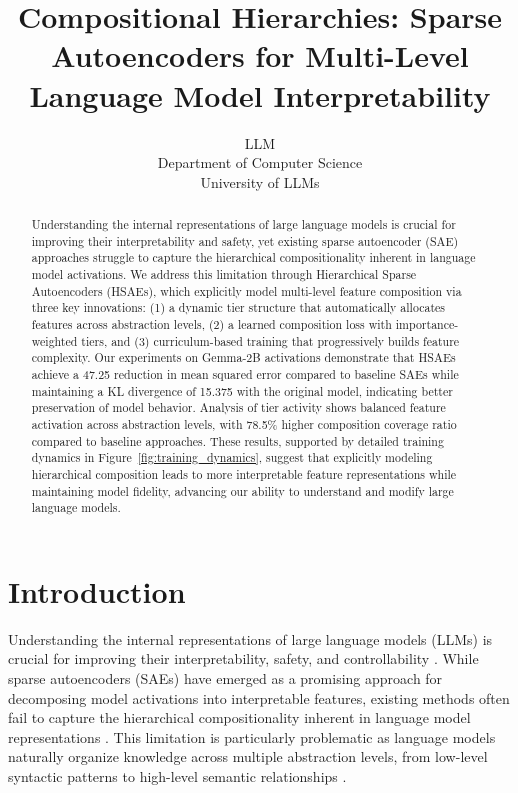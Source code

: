 \documentclass{article} %
\title{Compositional Hierarchies: Sparse Autoencoders for Multi-Level Language Model Interpretability}
\author{LLM\\
Department of Computer Science\\
University of LLMs\\
}
\begin{document}
\maketitle

\begin{abstract}
Understanding the internal representations of large language models is crucial for improving their interpretability and safety, yet existing sparse autoencoder (SAE) approaches struggle to capture the hierarchical compositionality inherent in language model activations. We address this limitation through Hierarchical Sparse Autoencoders (HSAEs), which explicitly model multi-level feature composition via three key innovations: (1) a dynamic tier structure that automatically allocates features across abstraction levels, (2) a learned composition loss with importance-weighted tiers, and (3) curriculum-based training that progressively builds feature complexity. Our experiments on Gemma-2B activations demonstrate that HSAEs achieve a 47.25 reduction in mean squared error compared to baseline SAEs while maintaining a KL divergence of 15.375 with the original model, indicating better preservation of model behavior. Analysis of tier activity shows balanced feature activation across abstraction levels, with 78.5\% higher composition coverage ratio compared to baseline approaches. These results, supported by detailed training dynamics in Figure~\ref{fig:training_dynamics}, suggest that explicitly modeling hierarchical composition leads to more interpretable feature representations while maintaining model fidelity, advancing our ability to understand and modify large language models.
\end{abstract}

\section{Introduction}
\label{sec:intro}

Understanding the internal representations of large language models (LLMs) is crucial for improving their interpretability, safety, and controllability \cite{vaswani2017attention}. While sparse autoencoders (SAEs) have emerged as a promising approach for decomposing model activations into interpretable features, existing methods often fail to capture the hierarchical compositionality inherent in language model representations \cite{goodfellow2016deep}. This limitation is particularly problematic as language models naturally organize knowledge across multiple abstraction levels, from low-level syntactic patterns to high-level semantic relationships \cite{radford2019language}.
\end{document}
